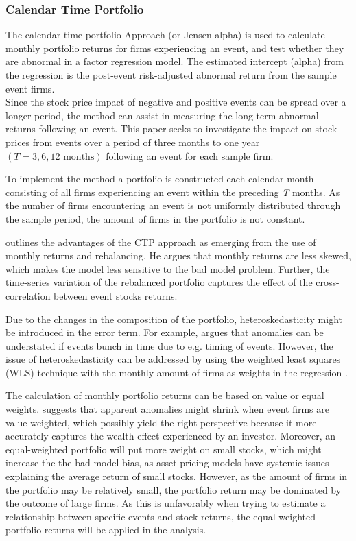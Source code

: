 \subsubsection{Calendar Time Portfolio}

The calendar-time portfolio Approach (or Jensen-alpha) is used to calculate monthly portfolio returns for firms experiencing an event, and test whether they are abnormal in a factor regression model. The estimated intercept (alpha) from the regression is the post-event risk-adjusted abnormal return from the sample event firms. \\
Since the stock price impact of negative and positive events can be spread over a longer period, the method can assist in measuring the long term abnormal returns following an event. This paper seeks to investigate the impact on stock prices from events over a period of three months to one year $(T = 3, 6, 12 \text{ months})$ following an event for each sample firm. 

To implement the method a portfolio is constructed each calendar month consisting of all firms experiencing an event within the preceding \textit{T} months. As the number of firms encountering an event is not uniformly distributed through the sample period, the amount of firms in the portfolio is not constant. 

\cite{fama1998_events} outlines the advantages of the CTP approach as emerging from the use of monthly returns and rebalancing. He argues that monthly returns are less skewed, which makes the model less sensitive to the bad model problem. Further, the time-series variation of the rebalanced portfolio captures the effect of the cross-correlation between event stocks returns. 

Due to the changes in the composition of the portfolio, heteroskedasticity might be introduced in the error term. For example, \cite{ritter1995} argues that anomalies can be understated if events bunch in time due to e.g. timing of events. However, the issue of heteroskedasticity can be addressed by using the weighted least squares (WLS) technique with the monthly amount of firms as weights in the regression \citep{Ang_event_method}.

The calculation of monthly portfolio returns can be based on value or equal weights. \cite{fama1998_events} suggests that apparent anomalies might shrink when event firms are value-weighted, which possibly yield the right perspective because it more accurately captures the wealth-effect experienced by an investor. Moreover, an equal-weighted portfolio will put more weight on small stocks, which might increase the the bad-model bias, as asset-pricing models have systemic issues explaining the average return of small stocks. However, as the amount of firms in the portfolio may be relatively small, the portfolio return may be dominated by the outcome of large firms. As this is unfavorably when trying to estimate a relationship between specific events and stock returns, the equal-weighted portfolio returns will be applied in the analysis. 

